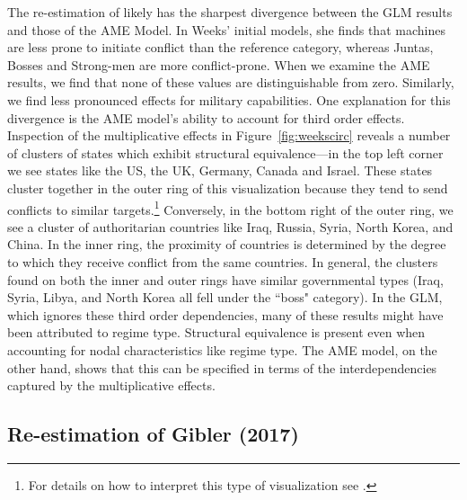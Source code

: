 The re-estimation of \citet{weeks:2012} likely has the sharpest divergence between the GLM results and those of the AME Model. In Weeks' initial models,  she finds that machines are less prone to initiate conflict than the reference category, whereas Juntas, Bosses and Strong-men are more conflict-prone. When we examine the AME results, we find that none of these values are distinguishable from zero. Similarly, we find less pronounced effects for military capabilities. One explanation for this divergence is the AME model's ability to account for third order effects. Inspection of the multiplicative effects in Figure~\ref{fig:weekscirc} reveals a number of clusters of states which exhibit structural equivalence---in the top left corner we see states like the US, the UK, Germany, Canada and Israel. These states cluster together in the outer ring of this visualization because they tend to send conflicts to similar targets.\footnote{For details on how to interpret this type of visualization see \citet{minhas:etal:2016:arxiv}.} Conversely, in the bottom right of the outer ring, we see a cluster of authoritarian countries like Iraq, Russia, Syria, North Korea, and China. In the inner ring, the proximity of countries is determined by the degree to which they receive conflict from the same countries. In general, the clusters found on both the inner and outer rings have similar governmental types (Iraq, Syria, Libya, and North Korea all fell under the ``boss" category). In the GLM, which ignores these third order dependencies, many of these results might have been attributed to regime type. Structural equivalence is present even when accounting for nodal characteristics like regime type.  The AME model, on the other hand, shows that this can be specified in terms of the interdependencies captured by the multiplicative effects. 


\subsection{Re-estimation of Gibler (2017)}

